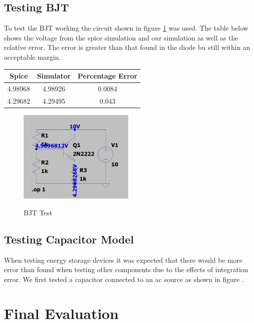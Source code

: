 \documentclass{article}
\begin{document}
\subsection{Testing BJT}
To test the BJT working the circuit shown in figure \ref{fig:BJTTest1} was used. The table below shows the voltage from the spice simulation and our simulation as well as the relative error. The error is greater than that found in the diode bu still within an acceptable margin. 
\begin{center}
\begin{tabular}{ ||c| c ||c ||}
\hline
 Spice & Simulator & Percentage Error \\ 
 \hline
 4.98968 & 4.98926 & 0.0084 \\  
 4.29682 & 4.29495 & 0.043 \\   
 \hline
\end{tabular}
\end{center}
\begin{figure}[h]
    \caption{BJT Test}
    \centering
    \includegraphics[width=0.5\textwidth]{images/BJTTest1.png}
    \label{fig:BJTTest1}
\end{figure}

\subsection{Testing Capacitor Model}
When testing energy storage devices it was expected that there would be more error than found when testing other components due to the effects of integration error. We first tested a capacitor connected to an ac source as shown in figure .
\section{Final Evaluation}

\newpage





\end{document}
